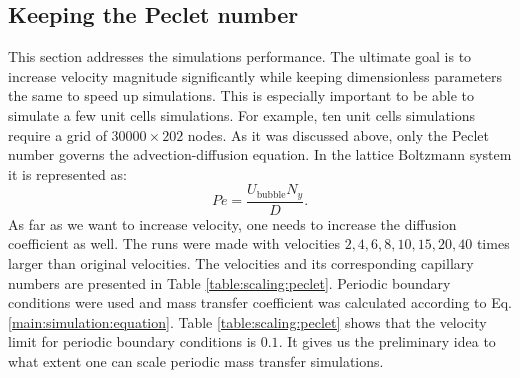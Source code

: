 \documentclass{article}
\newcommand{\beq}{\begin{equation}}
\newcommand{\feq}{\end{equation}}
\newcommand{\ububble}{U_{\mathrm{bubble}}}
\newcommand{\omegaminus}{\omega_{-}}
\begin{document}
\subsection{Keeping the Peclet number}
\label{section:keeping:peclet}
This section addresses the simulations performance. The ultimate goal is to increase
velocity magnitude significantly while keeping dimensionless parameters the same to
speed up                                      
simulations. This is especially important to be able to simulate a few unit cells simulations. For example, ten unit cells simulations require a grid of $30000\times202$ nodes.
As it was discussed above, only the Peclet number governs 
the advection-diffusion equation. In the lattice Boltzmann system it is represented as:
\beq
Pe=\frac{\ububble N_y}{D}.
\feq
As far as we want to increase velocity, one needs to increase the diffusion coefficient as well. The runs were made with
velocities $2,4,6,8,10,15,20,40$ times larger than original velocities. The velocities and
its corresponding capillary numbers are presented in Table \ref{table:scaling:peclet}. Periodic
boundary conditions were used and mass transfer coefficient was calculated according to Eq.
\ref{main:simulation:equation}. Table \ref{table:scaling:peclet} shows that the velocity limit
for  periodic boundary conditions is $0.1$. %
It gives us the
preliminary idea to what extent one can scale periodic mass transfer simulations. 
\end{document}
